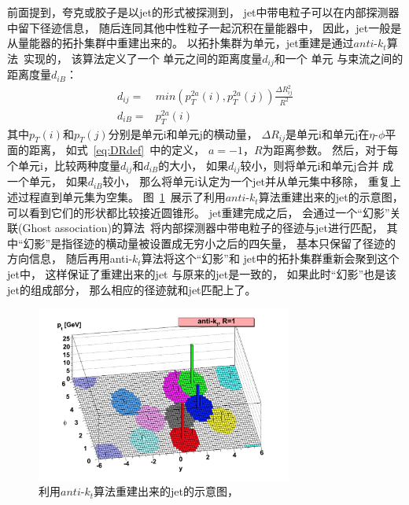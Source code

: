 前面提到，夸克或胶子是以jet的形式被探测到，
jet中带电粒子可以在内部探测器中留下径迹信息，
随后连同其他中性粒子一起沉积在量能器中，
因此，jet一般是从量能器的拓扑集群中重建出来的。
以拓扑集群为单元，jet重建是通过$anti$-$k_t$算法~\cite{ANTIKT}实现的，
该算法定义了一个
单元之间的距离度量$d_{ij}$和一个
单元
与束流之间的距离度量$d_{iB}$：
\begin{equation} 
\label{eq:TOPOSN}
\begin{split}
d_{ij}=&min\left( p_T^{2a}(i),p_T^{2a}(j) \right)\frac{\Delta R_{ij}^2}{R^2}
\\
d_{iB}=&p_T^{2a}(i)
 \end{split}
\end{equation}
其中$p_{T}(i)$和$p_{T}(j)$分别是单元i和单元j的横动量，
$\Delta R_{ij}$是单元i和单元j在$\eta$-$\phi$平面的距离，
如式~\ref{eq:DRdef}~中的定义，
$a=-1$，$R$为距离参数。
然后，对于每个单元i，比较两种度量$d_{ij}$和$d_{iB}$的大小，
如果$d_{ij}$较小，则将单元i和单元j合并
成一个单元，
如果$d_{iB}$较小，
那么将单元i认定为一个jet并从单元集中移除，
重复上述过程直到单元集为空集。
图~\ref{fig:ATLASJET1}~展示了利用$anti$-$k_t$算法重建出来的jet的示意图，
可以看到它们的形状都比较接近圆锥形。
jet重建完成之后，
会通过一个“幻影”关联(Ghost association)的算法~\cite{Cacciari:2008gn}将内部探测器中带电粒子的径迹与jet进行匹配，
其中“幻影”是指径迹的横动量被设置成无穷小之后的四矢量，
基本只保留了径迹的方向信息，
随后再用anti-$k_t$算法将这个“幻影”和
jet中的拓扑集群重新会聚到这个jet中，
这样保证了重建出来的jet
与原来的jet是一致的，
如果此时“幻影”也是该jet的组成部分，
那么相应的径迹就和jet匹配上了。



\begin{figure}
 \begin{center}
    \includegraphics[width=0.75\textwidth]{figuresEXP/ATLASJET1.jpg}
  \end{center}
  \caption{
利用$anti$-$k_t$算法重建出来的jet的示意图，
  }
    \label{fig:ATLASJET1}
\end{figure}


